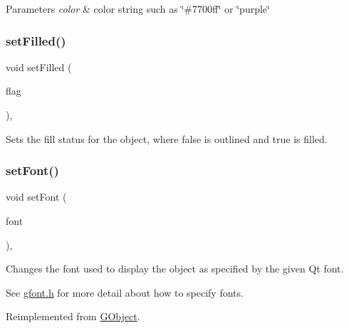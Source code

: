 \begin{DoxyParams}{Parameters}
{\em color} & color string such as \char`\"{}\#7700ff\char`\"{} or \char`\"{}purple\char`\"{} \\
\hline
\end{DoxyParams}
\mbox{\label{classsgl_1_1GObject_a9b82b53362282c6bb7d6947068d2e55b}} 
\subsubsection{\texorpdfstring{set\+Filled()}{setFilled()}}
{\footnotesize\ttfamily void set\+Filled (\begin{DoxyParamCaption}\item[{bool}]{flag }\end{DoxyParamCaption})\hspace{0.3cm}{\ttfamily [virtual]}, {\ttfamily [inherited]}}



Sets the fill status for the object, where {\ttfamily false} is outlined and {\ttfamily true} is filled. 

\mbox{\label{classsgl_1_1GText_ad1d75b3840a41ba7d1e8a921696dc684}} 
\subsubsection{\texorpdfstring{set\+Font()}{setFont()}\hspace{0.1cm}{\footnotesize\ttfamily [1/2]}}
{\footnotesize\ttfamily void set\+Font (\begin{DoxyParamCaption}\item[{const Q\+Font \&}]{font }\end{DoxyParamCaption})\hspace{0.3cm}{\ttfamily [override]}, {\ttfamily [virtual]}}



Changes the font used to display the object as specified by the given Qt font. 

See \mbox{\hyperlink{gfont_8h_source}{gfont.\+h}} for more detail about how to specify fonts. 

Reimplemented from \mbox{\hyperlink{classsgl_1_1GObject_a2592348886ffea646c6534bf88f7c49d}{G\+Object}}.

